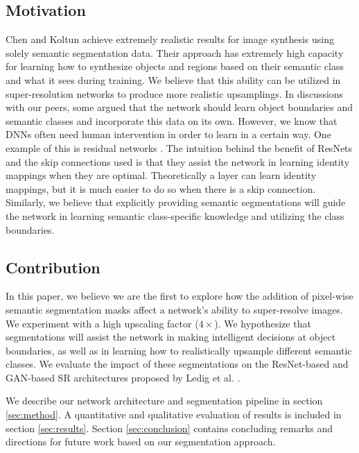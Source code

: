 \documentclass[10pt,twocolumn,letterpaper]{article}
\begin{document}
\subsection{Motivation}
Chen and Koltun achieve extremely realistic results for image synthesis using
solely semantic segmentation data. Their approach has extremely high capacity
for learning how to synthesize objects and regions based on their semantic
class and what it sees during training. We believe that this ability can be
utilized in super-resolution networks to produce more realistic upsamplings. In
discussions with our peers, some argued that the network should learn object
boundaries and semantic classes and incorporate this data on its own. However,
we know that DNNs often need human intervention in order to learn in a certain
way. One example of this is residual networks \cite{ResNet}. The intuition
behind the benefit of ResNets and the skip connections used is that they assist
the network in learning identity mappings when they are optimal. Theoretically
a layer can learn identity mappings, but it is much easier to do so when there
is a skip connection. Similarly, we believe that explicitly providing semantic
segmentations will guide the network in learning semantic class-specific
knowledge and utilizing the class boundaries.

\subsection{Contribution}
In this paper, we believe we are the first to explore how the addition of
pixel-wise semantic segmentation masks affect a network's ability to
super-resolve images. We experiment with a high upscaling factor ($4 \times$).
We hypothesize that segmentations will assist the network in making intelligent
decisions at object boundaries, as well as in learning how to realistically
upsample different semantic classes. We evaluate the impact of these
segmentations on the ResNet-based and GAN-based SR architectures proposed by
Ledig et al. \cite{SRGAN}.

We describe our network architecture and segmentation pipeline in section
\ref{sec:method}. A quantitative and qualitative evaluation of results is
included in section \ref{sec:results}. Section \ref{sec:conclusion} contains
concluding remarks and directions for future work based on our segmentation
approach.

\end{document}
